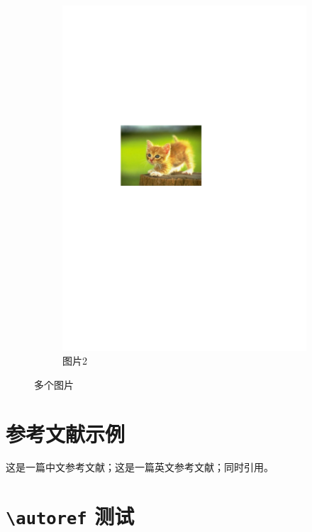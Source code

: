 \documentclass[format=draft,language=chinese,category=SDN]{hustreport}
\begin{document}
\begin{figure}[!h]
\begin{subfigure}[b]{0.3\textwidth}
  \includegraphics[width=\textwidth]{fig/fig-example.pdf}
  \caption{图片2}\label{fig:2-2}
  \end{subfigure}
\caption{多个图片}\label{fig:2}
\end{figure}

\section{参考文献示例}
这是一篇中文参考文献\cite{TEXGURU99}；这是一篇英文参考文献\cite{knuth}；同时引用\cite{TEXGURU99,knuth}。

\section[\textbackslash{}autoref 测试]{\texttt{\textbackslash{}autoref} 测试}
\end{document}
